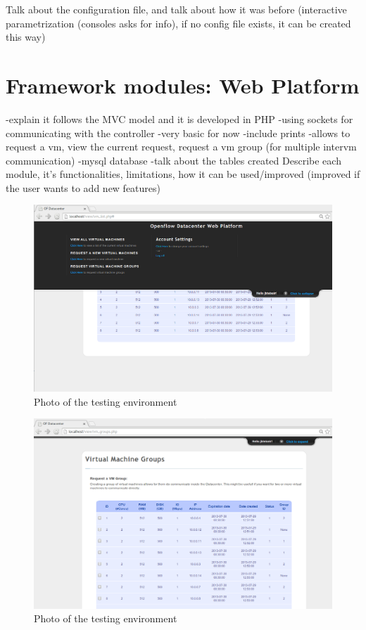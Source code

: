 \documentclass[12pt,english,oneside]{book}
\begin{document}
Talk about the configuration file, and talk about how it was before (interactive parametrization (consoles asks for info), if no config file exists, it can be created this way)

\newpage

\section{Framework modules: Web Platform}
\hspace{0.6cm}

-explain it follows the MVC model and it is developed in PHP
-using sockets for communicating with the controller
-very basic for now
-include prints
-allows to request a vm, view the current request, request a vm group (for multiple intervm communication)
-mysql database
 -talk about the tables created
Describe each module, it's functionalities, limitations, how it can be used/improved (improved if the user wants to add new features)

\begin{figure}[htbp]
        \centering
        \includegraphics[width=1\textwidth]{figures/webplat_panel.png}
        \caption{Photo of the testing environment}
        \label{fig:realenv}
\end{figure}

\begin{figure}[htbp]
        \centering
        \includegraphics[width=1\textwidth]{figures/webplat_vmgroup.png}
        \caption{Photo of the testing environment}
        \label{fig:realenv}
\end{figure}
\end{document}
